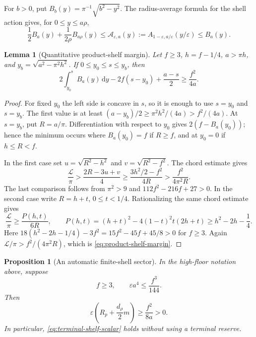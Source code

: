 \documentclass[11pt]{article}
\newtheorem{proposition}[theorem]{Proposition}
\newtheorem{lemma}[theorem]{Lemma}
\theoremstyle{remark}
\newcommand{\dd}{\,\mathrm d}
\begin{document}
For $b>0$, put $B_b(y)=\pi^{-1}\sqrt{b^2-y^2}$.  The radius-average
formula for the shell action gives, for $0\leq y\leq a\rho$,
\begin{equation}
 \frac12B_a(y)+\frac1{2\rho}B_{a\rho}(y)
 \leq \mathcal A_{\varepsilon,a}(y)
 :=A_{1-\varepsilon,a/\varepsilon}(y/\varepsilon)
 \leq B_a(y).
 \label{eq:product-action-sandwich}
\end{equation}

\begin{lemma}[Quantitative product-shelf margin]
\label{lem:product-shelf-margin}
Let $f\geq3$, $h=f-1/4$, $a>\pi h$, and
$y_b=\sqrt{a^2-\pi^2h^2}$.  If $0\leq y_0\leq s\leq y_b$, then
\begin{equation}
 \boxed{
 2\int_{y_0}^{s}B_a(y)\dd y-2f(s-y_0)+\frac{a-s}{2}
 \geq\frac{f^2}{4a}.}
 \label{eq:product-shelf-margin}
\end{equation}
\end{lemma}

\begin{proof}
For fixed $y_0$ the left side is concave in $s$, so it is enough to use
$s=y_0$ and $s=y_b$.  The first value is at least
$(a-y_b)/2\geq\pi^2h^2/(4a)>f^2/(4a)$.
At $s=y_b$, put $R=a/\pi$.  Differentiation with respect to $y_0$ gives
$2(f-B_a(y_0))$; hence the minimum occurs where $B_a(y_0)=f$ if
$R\geq f$, and at $y_0=0$ if $h\leq R<f$.

In the first case set
$u=\sqrt{R^2-h^2}$ and $v=\sqrt{R^2-f^2}$.  The chord estimate gives
\[
 \frac{\mathcal L}{\pi}>
 \frac{2R-3u+v}{4}
 \geq\frac{3h^2/2-f^2}{4R}
 >\frac{f^2}{4\pi^2R}.
\]
The last comparison follows from $\pi^2>9$ and
$112f^2-216f+27>0$.  In the second case write $R=h+t$,
$0\leq t<1/4$.  Rationalizing the same chord estimate gives
\[
 \frac{\mathcal L}{\pi}\geq\frac{P(h,t)}{6R},\qquad
 P(h,t)=(h+t)^2-4(1-t)^2t(2h+t)
 \geq h^2-2h-\frac14.
\]
Here $18(h^2-2h-1/4)-3f^2=15f^2-45f+45/8>0$ for $f\geq3$.
Again $\mathcal L/\pi>f^2/(4\pi^2R)$, which is
\eqref{eq:product-shelf-margin}.
\end{proof}

\begin{proposition}[An automatic finite-shell sector]
\label{prop:ultrathin-high-floor-sector}
In the high-floor notation above, suppose
\begin{equation}
 f\geq3,\qquad \varepsilon a^4\leq\frac{f^3}{144}.
 \label{eq:ultrathin-sector}
\end{equation}
Then
\begin{equation}
 \boxed{
 \varepsilon\left(R_p+\frac{d_\rho}{2}m\right)
 \geq\frac{f^2}{8a}>0.}
 \label{eq:ultrathin-positive-prefix}
\end{equation}
In particular, \eqref{eq:terminal-shelf-scalar} holds without using a
terminal reserve.
\end{proposition}
\end{document}
